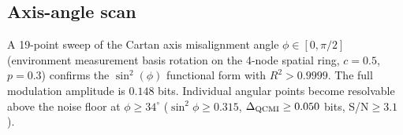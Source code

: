 \documentclass[aps,prl,superscriptaddress,nofootinbib]{revtex4-2}
\begin{document}
\subsection{Axis-angle scan}

A 19-point sweep of the Cartan axis misalignment angle $\phi\in[0,\pi/2]$ (environment measurement basis rotation on the 4-node spatial ring, $c=0.5$, $p=0.3$) confirms the $\sin^2(\phi)$ functional form with $R^2>0.9999$. The full modulation amplitude is $0.148$ bits. Individual angular points become resolvable above the noise floor at $\phi\geq34^\circ$ ($\sin^2\phi\geq0.315$, $\Delta_{\rm QCMI}\geq0.050$ bits, S/N$\geq3.1$).
\end{document}
